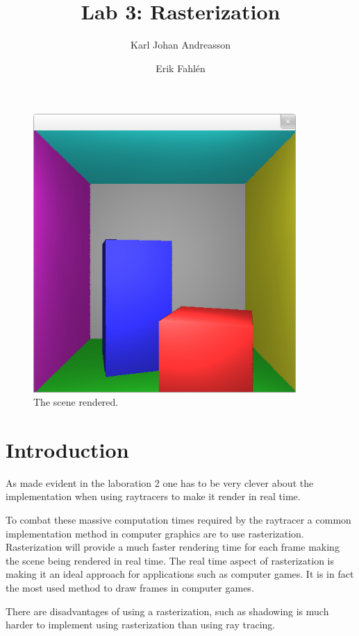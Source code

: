 \documentclass[a4paper]{article}
\begin{document}
\title{Lab 3: Rasterization}

\author{Karl Johan Andreasson \and Erik Fahlén}

\maketitle

\begin{figure}
    \centering
    \includegraphics[width=10cm]{title.png}
    \caption{The scene rendered.}
    \label{fig:main}
\end{figure}

\section{Introduction}
As made evident in the laboration 2 one has to be very clever about the
implementation when using raytracers to make it render in real time.

To combat these massive computation times required by the raytracer a common
implementation method in computer graphics are to use rasterization.
Rasterization will provide a much faster rendering time for each frame making
the scene being rendered in real time. The real time aspect of rasterization is
making it an ideal approach for applications such as computer games. It is in
fact the most used method to draw frames in computer games.

There are disadvantages of using a rasterization, such as shadowing is much
harder to implement using rasterization than using ray tracing.
\end{document}

